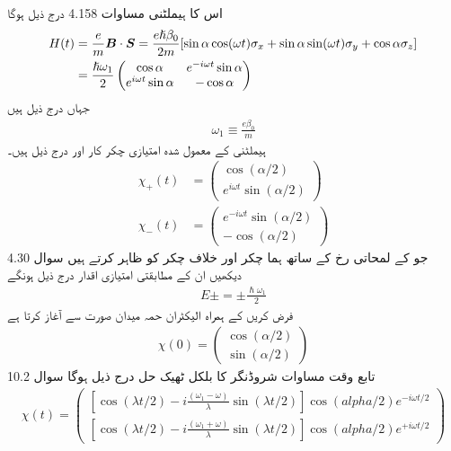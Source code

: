 اس کا ہيملٹنی مساوات 4.158 درج ذیل ہوگا 
\begin{gather}
\begin{aligned}
H(t) &= \frac{e}{m} {{\boldsymbol{B}}} \cdot {\ensuremath{{\boldsymbol{S}}}} = \frac{e \hslash \beta_0}{2m} [\sin \alpha \cos(\omega t) \sigma_x + \sin \alpha \sin(\omega t) \sigma_y + \cos \alpha \sigma_z] \\
&= \frac{\hslash \omega_1}{2}
\begin{pmatrix}
\cos \alpha& e^{-i\omega t}\sin \alpha\\
e^{i\omega t}\sin\alpha& -\cos\alpha
\end{pmatrix} 
\end{aligned}
\end{gather}
جہاں  درج ذیل ہیں 
\begin{align}
\omega_1 \equiv \frac{e \beta_0}{m}
\end{align}
ہيملٹنی  کے معمول شدہ امتیازی چکر کار   اور  درج ذیل ہیں۔
\begin{align}
\chi_+ (t) &= 
\begin{pmatrix}
\cos(\alpha/2) \\
e^{i \omega t} \sin(\alpha/2)
\end{pmatrix}\\
\chi_{-} (t) &= 
\begin{pmatrix}
e^{-i \omega t} \sin(\alpha/2) \\
- \cos(\alpha/2)
\end{pmatrix}
\end{align}
جو  کے لمحاتی رخ کے ساتھ ہما چکر اور خلاف چکر کو ظاہر کرتے ہیں سوال 4.30 دیکھیں ان کے مطابقتی امتیازی اقدار درج ذیل ہونگے 
\begin{align}
E \pm = \pm \frac{\hslash \omega_1}{2}
\end{align}
فرض کریں  کے ہمراہ الیکٹران حمہ میدان صورت سے آغاز کرتا ہے 
\begin{align}
\chi (0) = 
\begin{pmatrix} 
\cos(\alpha/2) \\
\sin(\alpha/2)
\end{pmatrix}
\end{align}
تابع وقت مساوات شروڈنگر کا بلکل ٹھیک حل درج ذیل ہوگا سوال 10.2
\begin{align}
\chi (t) = 
\begin{pmatrix}
[\cos(\lambda t/2) - i \frac{(\omega_1 - \omega)}{\lambda} \sin(\lambda t/2)] \cos(alpha/2) e^{- i \omega t/2} \\
[\cos(\lambda t/2) - i \frac{(\omega_1 + \omega)}{\lambda} \sin(\lambda t/2)] \cos(alpha/2) e^{+ i \omega t/2}
\end{pmatrix}
\end{align}
